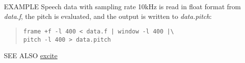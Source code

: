 \begin{qsection}{EXAMPLE}
Speech data with sampling rate 10kHz is read in float format
from {\em data.f}, the pitch is evaluated, and
the output is written to {\em data.pitch}:
\begin{quote}
  \verb!frame +f -l 400 < data.f | window -l 400 |\ !\\
  \verb!pitch -l 400 > data.pitch!
\end{quote}
\end{qsection}

\begin{qsection}{SEE ALSO}
\hyperlink{excite}{excite}
\end{qsection}
